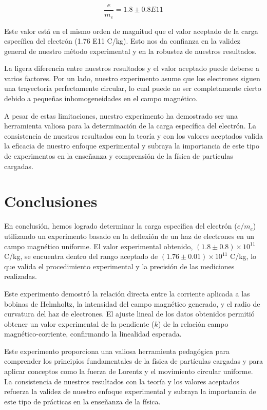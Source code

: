 \documentclass[twocolumn,a4paper,11pt]{scrartcl}
\begin{document}
\begin{equation}
\frac{e}{m_e} = 1.8 \pm 0.8 E11  
\end{equation}


Este valor está en el mismo orden de magnitud que el valor aceptado de la carga específica del electrón (1.76 E11 C/kg). Esto nos da confianza en la validez general de nuestro método experimental y en la robustez de nuestros resultados.

La ligera diferencia entre nuestros resultados y el valor aceptado puede deberse a varios factores. Por un lado, nuestro experimento asume que los electrones siguen una trayectoria perfectamente circular, lo cual puede no ser completamente cierto debido a pequeñas inhomogeneidades en el campo magnético.

A pesar de estas limitaciones, nuestro experimento ha demostrado ser una herramienta valiosa para la determinación de la carga específica del electrón. La consistencia de nuestros resultados con la teoría y con los valores aceptados valida la eficacia de nuestro enfoque experimental y subraya la importancia de este tipo de experimentos en la enseñanza y comprensión de la física de partículas cargadas.

\section{Conclusiones}
En conclusión, hemos logrado determinar la carga específica del electrón ($e/m_e$) utilizando un experimento basado en la deflexión de un haz de electrones en un campo magnético uniforme. El valor experimental obtenido, $(1.8 \pm 0.8) \times 10^{11}$ C/kg, se encuentra dentro del rango aceptado de $(1.76 \pm 0.01) \times 10^{11}$ C/kg, lo que valida el procedimiento experimental y la precisión de las mediciones realizadas.

Este experimento demostró la relación directa entre la corriente aplicada a las bobinas de Helmholtz, la intensidad del campo magnético generado, y el radio de curvatura del haz de electrones. El ajuste lineal de los datos obtenidos permitió obtener un valor experimental de la pendiente ($k$) de la relación campo magnético-corriente, confirmando la linealidad esperada.


Este experimento proporciona una valiosa herramienta pedagógica para comprender los principios fundamentales de la física de partículas cargadas y para aplicar conceptos como la fuerza de Lorentz y el movimiento circular uniforme. La consistencia de nuestros resultados con la teoría y los valores aceptados refuerza la validez de nuestro enfoque experimental y subraya la importancia de este tipo de prácticas en la enseñanza de la física.


  
\end{document}
